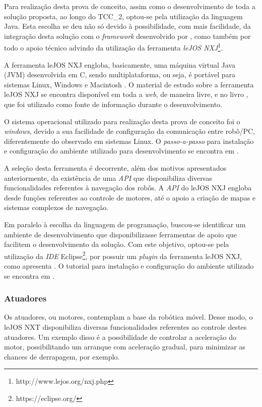 		Para realização desta prova de conceito, assim como o desenvolvimento de toda a solução proposta, ao longo do TCC\_2, optou-se pela utilização da linguagem Java. Esta escolha se deu não só devido à possibilidade, com mais facilidade, da integração desta solução com o \textit{framework} desenvolvido por \cite{tccRodrigo}, como também por todo o apoio técnico advindo da utilização da ferramenta \textit{leJOS NXJ}\footnote{http://www.lejos.org/nxj.php}.

		A ferramenta leJOS NXJ engloba, basicamente, uma máquina virtual Java (JVM) desenvolvida em C, sendo multiplataforma, ou seja, é portável para sistemas Linux, Windows e Macintosh \cite{legonxj}. O material de estudo sobre a ferramenta leJOS NXJ se encontra disponível em toda a \textit{web}, de maneira livre, e no livro \cite{legonxj}, que foi utilizado como fonte de informação durante o desenvolvimento.

		O sistema operacional utilizado para realização desta prova de conceito foi o \textit{windows}, devido a sua facilidade de configuração da comunicação entre robô/PC, diferentemente do observado em sistemas Linux. O \textit{passo-a-passo} para instalação e configuração do ambiente utilizado para desenvolvimento se encontra em \cite[p. 6]{legonxj}.

		A seleção desta ferramenta é decorrente, além dos motivos apresentados anteriormente, da existência de uma \textit{API} que disponibiliza diversas funcionalidades referentes à navegação dos robôs. A \textit{API} do leJOS NXJ engloba desde funções referentes ao controle de motores, até o apoio a criação de mapas e sistemas complexos de navegação.

		Em paralelo à escolha da linguagem de programação, buscou-se identificar um ambiente de desenvolvimento que disponibilizasse ferramentas de apoio que facilitem o desenvolvimento da solução. Com este objetivo, optou-se pela utilização da \textit{IDE} Eclipse\footnote{https://eclipse.org/}, por possuir um \textit{plugin} da ferramenta leJOS NXJ, como apresenta \cite{legonxj}. O tutorial para instalação e configuração do ambiente utilizado se encontra em \cite[p. 14]{legonxj}.

	\subsubsection{Atuadores}

		Os atuadores, ou motores, contemplam a base da robótica móvel. Desse modo, o leJOS NXT disponibiliza diversas funcionalidades referentes ao controle destes atuadores. Um exemplo disso é a possibilidade de controlar a aceleração do motor, possibilitando um arranque com aceleração gradual, para minimizar as chances de derrapagem, por exemplo.

